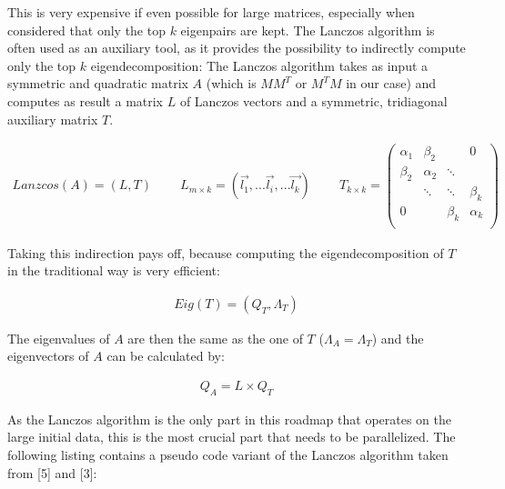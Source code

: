 This is very expensive if even possible for large matrices, especially when
considered that only the top $k$ eigenpairs are kept. The Lanczos algorithm is
often used as an auxiliary tool, as it provides the possibility to indirectly
compute only the top $k$ eigendecomposition: The Lanczos algorithm takes as
input a symmetric and quadratic matrix $A$ (which is $MM^T$ or $M^T M$ in our
case) and computes as result a matrix $L$ of Lanczos vectors and a symmetric,
tridiagonal auxiliary matrix $T$.

\begin{align*}
	Lanzcos(A) = (L,T) \;\;\;\;\;\;\;\;
L_{m\times k} = \left ( \vec{l_1}, ... \vec{l_i}, ... \vec{l_k} \right )
\;\;\;\;\;\;\;\;
	T_{k\times k} = \begin{pmatrix}  
\alpha_1 & \beta_2  &          & 0 \\
\beta_2  & \alpha_2 & \ddots   & \\
         & \ddots   & \ddots   & \beta_k \\
0        &          & \beta_k  & \alpha_k \\
\end{pmatrix}
\end{align*}

Taking this indirection pays off, because computing the eigendecomposition of
$T$ in the traditional way is very efficient:

\begin{align*}
	Eig(T) = (Q_T,\Lambda_T)
\end{align*}

The eigenvalues of $A$ are then the same as the one of $T$ ($\Lambda_A =
\Lambda_T$) and the eigenvectors of $A$ can be calculated by:

\begin{align*}
	Q_A = L \times Q_T
\end{align*}

As the Lanczos algorithm is the only part in this roadmap that operates on the
large initial data, this is the most crucial part that needs to be
parallelized. The following listing contains a pseudo code variant of the
Lanczos algorithm taken from [5] and [3]:

